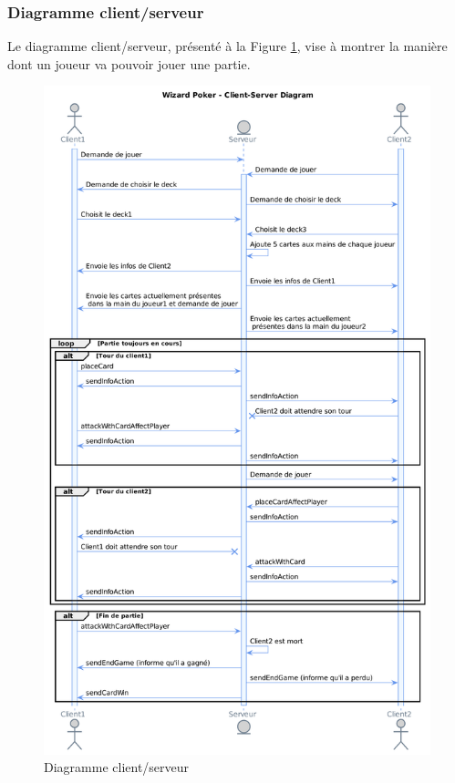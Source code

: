 \documentclass[11pt,a4paper]{article}
\begin{document}
\subsubsection{Diagramme client/serveur}

Le diagramme client/serveur, présenté à la Figure \ref{fig:seq}, vise à montrer la manière dont un joueur va
pouvoir jouer une partie.

\begin{figure}[ht]
  \centering
  \includegraphics[width=1\textwidth]{assets/uml/ClientServerDiagram.png}
  \caption{\label{fig:seq} Diagramme client/serveur}
\end{figure}
\end{document}
